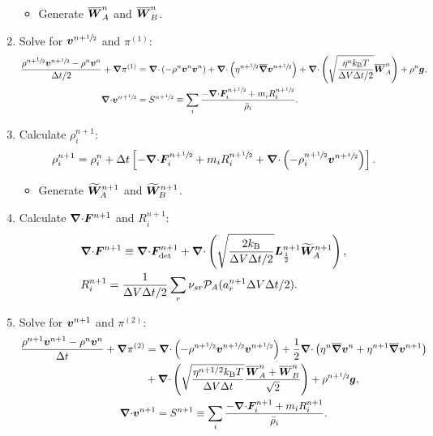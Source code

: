 \documentclass[
10pt
showpacs, showkeys,
amsmath,amssymb,
aps,
pre,
floatfix,
]{revtex4-1}
\newcommand{\divg}{{\V\nabla\cdot}}                       %
\newcommand{\paren}[1]{{(#1)}}                            %
\begin{document}
\begin{enumerate}
\begin{itemize}
\item Generate $\overline{\boldsymbol{W}}^n_A$ and $\overline{\boldsymbol{W}}^n_B$.
\end{itemize}

\item Solve for $\boldsymbol{v}^{n+\sfrac{1}{2}}$ and $\pi^\paren{1}$:
\begin{align}
\label{inertial_stokes_v_1st}
\frac{\rho^{n+\myhalf}\V{v}^{n+\myhalf}-\rho^n\V{v}^n}{\D{t}/2} + \grad\pi^\paren{1}
& = \divg\left(-\rho^n\V{v}^n\V{v}^n\right) + \divg\left( \eta^{n+\myhalf} \overline{\grad}\V{v}^{n+\myhalf} \right)
+ \divg\left( \sqrt{\frac{\eta^n k_\mathrm{B}T}{\D{V}\D{t}/2} } \overline{\V{W}}^n_A \right) + \rho^n\V{g},
\\
\label{inertial_stokes_p_1st}
\divg\V{v}^{n+\myhalf}
& = S^{n+\myhalf}\equiv \sum_i \frac{-\divg\V{F}^{n+\myhalf}_i + m_i R^{n+\myhalf}_i }{\bar{\rho}_i}.
\end{align}

\item Calculate $\rho^{n+1}_i$:
\begin{equation}
\rho^{n+1}_i = \rho^n_i + \D{t} \left[ -\divg\V{F}^{n+\myhalf}_i + m_i R^{n+\myhalf}_i + \divg\left( -\rho^{n+\myhalf}_i \V{v}^{n+\myhalf} \right) \right].
\end{equation} 

\begin{itemize}
\item Generate $\widetilde{\boldsymbol{W}}^{n+1}_A$ and $\widetilde{\boldsymbol{W}}^{n+1}_B$.
\end{itemize}

\item Calculate $\divg\V{F}^{n+1}$ and $R^{n+1}_i$:
\begin{align}
\label{inertial_fluxdiv_2nd}
& \divg\V{F}^{n+1} \equiv \divg\V{F}_\mathrm{det}^{n+1} + \divg\left( \sqrt{ \frac{2k_\mathrm{B}}{\D{V}\D{t}/2} } \V{L}^{n+1}_{\frac12} \widetilde{\V{W}}^{n+1}_A \right), \\
\label{inertial_chemrate_2nd}
& R^{n+1}_i = \frac{1}{\D{V}\D{t}/2}\sum_r \nu_{sr}\mathcal{P}_A(a^{n+1}_r\D{V}\D{t}/2).
\end{align}

\item Solve for $\boldsymbol{v}^{n+1}$ and $\pi^\paren{2}$:
\begin{gather}
\label{inertial_stokes_v_2nd}
\begin{split}
\frac{\rho^{n+1}\V{v}^{n+1}-\rho^n\V{v}^n}{\D{t}} + \grad\pi^\paren{2}
&= \divg\left(-\rho^{n+\myhalf}\V{v}^{n+\myhalf}\V{v}^{n+\myhalf}\right) + \frac{1}{2}\divg\left( \eta^n \overline{\grad}\V{v}^n + \eta^{n+1} \overline{\grad}\V{v}^{n+1} \right) \\
&+ \divg\left( \sqrt{\frac{\eta^{n+1/2} k_\mathrm{B}T}{\D{V}\D{t}} } \frac{\overline{\V{W}}^n_A + \overline{\V{W}}^n_B}{\sqrt{2}} \right) + \rho^{n+\myhalf}\V{g},
\end{split} \\
\label{inertial_stokes_p_2nd}
\divg\V{v}^{n+1}=S^{n+1}\equiv \sum_i \frac{-\divg\V{F}^{n+1}_i + m_i R^{n+1}_i }{\bar{\rho}_i}.
\end{gather}


\end{enumerate}
\end{document}
